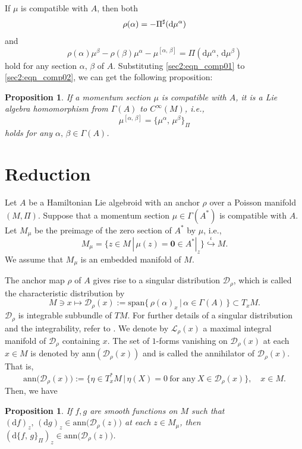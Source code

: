 \documentclass[a4paper,11pt,dvipdfmx]{article}
\newtheorem{prop}[thm]{Proposition}
\numberwithin{equation}{section}
\begin{document}
If $\mu$ is compatible with $A$, then both 
\begin{equation}\label{sec2:eqn_comp01}
\rho(\alpha) = -\Pi^{\sharp}({\rm d}\mu^{\alpha}) 
\end{equation}
and 
\begin{equation}\label{sec2:eqn_comp02}
\rho(\alpha)\mu^\beta-\rho(\beta)\mu^{\alpha} - \mu^{[\alpha,\,\beta]} = \Pi(\mathrm{d}\mu^{\alpha},\,\mathrm{d}\mu^{\beta})
\end{equation}
hold for any section $\alpha,\,\beta$ of $A$. Substituting \eqref{sec2:eqn_comp01} to \eqref{sec2:eqn_comp02}, we can get the following proposition: 

\begin{prop}
If a momentum section $\mu$ is compatible with $A$, it is a Lie algebra homomorphism from $\varGamma(A)$ to $C^{\infty}(M)$, i.e., 
\[
 \mu^{[\alpha,\,\beta]} = \{\mu^{\alpha},\,\mu^{\beta}\}_{\Pi} 
\]
holds for any $\alpha,\,\beta\in \varGamma(A)$. 
\end{prop}
\section{Reduction}

Let $A$ be a Hamiltonian Lie algebroid with an anchor $\rho$ over a Poisson manifold $(M,\Pi)$. 
Suppose that a momentum section $\mu\in \varGamma(A^*)$ is compatible with $A$. 
Let $M_{\mu}$ be the preimage of the zero section of $A^*$ by $\mu$, i.e., 
\[
M_{\mu}=\bigl\{z\in M\,|\, \mu(z)=\boldsymbol{0}\in A^*|_z\bigr\}\overset{\iota}{\hookrightarrow} M. 
\] 
We assume that $M_{\mu}$ is an embedded manifold of $M$. 

The anchor map $\rho$ of $A$ gives rise to a singular distribution $\mathcal{D}_{\rho}$, which is called the characteristic distribution by 
\[
 M\ni x\longmapsto \mathcal{D}_{\rho}(x):=\mathrm{span}\bigl\{\,\rho(\alpha)_x\,|\, \alpha\in \varGamma(A)\,\bigr\}\subset T_xM. 
\]
$\mathcal{D}_{\rho}$ is integrable subbundle of $TM$. For further details of a singular distribution and the integrability, refer to \cite{DZpoi05, Sacc74, Sorb73}. 
We denote by $\mathcal{L}_{\rho}(x)$ a maximal integral manifold of $\mathcal{D}_{\rho}$ containing $x$. 
The set of $1$-forms vanishing on $\mathcal{D}_{\rho}(x)$ at each $x\in M$ is denoted by $\mathrm{ann}(\mathcal{D}_{\rho}(x))$ and is called the annihilator of $\mathcal{D}_{\rho}(x)$. 
That is, 
\[
 \mathrm{ann}\bigl(\mathcal{D}_{\rho}(x)\bigr) := \bigl\{\eta\in T_x^*M\,|\,\eta(X)=0~ \text{for any}~X\in \mathcal{D}_{\rho}(x) \bigr\},\quad x\in M.
\]
Then, we have 
\begin{prop}\label{sec3:prop_vanishing}
If $f, g$ are smooth functions on $M$ such that $(\mathrm{d}f)_z,\,(\mathrm{d}g)_z\in \mathrm{ann}\bigl(\mathcal{D}_{\rho}(z)\bigr)$ at each $z\in M_{\mu}$, then 
$(\mathrm{d}\{f,\,g\}_{\Pi})_z\in \mathrm{ann}\bigl(\mathcal{D}_{\rho}(z)\bigr)$. 
\end{prop}
\end{document}
